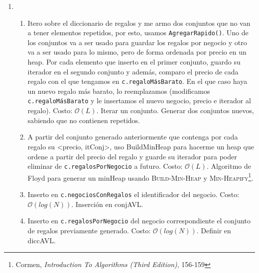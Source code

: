 \documentclass[10pt, a4paper]{article}
\newcommand{\bigO}{\mathcal{O}}
\begin{document}
\begin{Algoritmos}
	\begin{enumerate}
		\item {}
		\begin{enumerate}
			\item Itero sobre el diccionario de regalos y me armo dos conjuntos que no van a tener elementos repetidos, por esto, usamos \texttt{AgregarRapido()}. Uno de los conjuntos va a ser usado para guardar los regalos por negocio y otro va a ser usado para lo mismo, pero de forma ordenada por precio en un heap. Por cada elemento que inserto en el primer conjunto, guardo su iterador en el segundo conjunto y adem\'as, comparo el precio de cada regalo con el que tengamos en \texttt{c.regaloM\'asBarato}. En el que caso haya un nuevo regalo m\'as barato, lo reemplazamos (modificamos \texttt{c.regaloM\'asBarato} y le insertamos el nuevo negocio, precio e iterador al regalo). Costo: $\bigO(L)$. Iterar un conjunto. Generar dos conjuntos nuevos, sabiendo que no contienen repetidos.
			\item A partir del conjunto generado anteriormente que contenga por cada regalo su <precio, itConj>, uso BuildMinHeap para hacerme un heap que ordene a partir del precio del regalo y guarde su iterador para poder eliminar de \texttt{c.regalosPorNegocio} a futuro. Costo: $\bigO(L)$. Algoritmo de Floyd para generar un minHeap usando \textsc{Build-Min-Heap} y \textsc{Min-Heapify}\footnote{Cormen, \textit{Introduction To Algorithms (Third Edition)}, 156-159}.
			\item Inserto en \texttt{c.negociosConRegalos} el identificador del negocio. Costo: $\bigO(log(N))$. Inserci\'on en conjAVL.
			\item Inserto en \texttt{c.regalosPorNegocio} del negocio correspondiente el conjunto de regalos previamente generado. Costo: $\bigO(log(N))$. Definir en diccAVL.


\end{enumerate}
\end{enumerate}
\end{Algoritmos}
\end{document}
